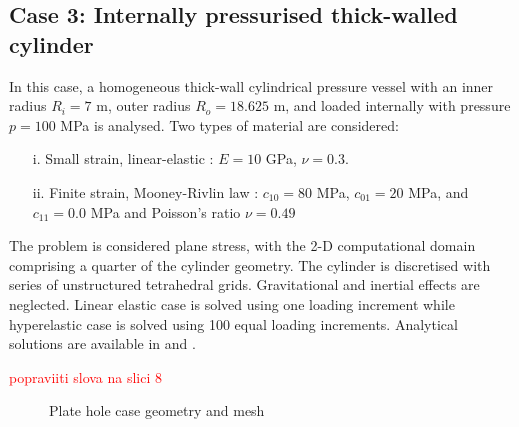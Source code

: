 \documentclass[sn-mathphys,Numbered]{sn-jnl}%
\begin{document}
\subsection{Case 3: Internally pressurised thick-walled cylinder}

In this case, a homogeneous thick-wall cylindrical pressure vessel with an inner radius $R_i = 7$ m, outer radius $R_o = 18.625$ m, and loaded internally with pressure $p = 100$ MPa is analysed. Two types of material are considered:
\begin{itemize}
\item[i.] Small strain, linear-elastic \cite{Bijelonja2006}: $E=10$ GPa, $\nu=0.3$.
\item[ii.] Finite strain, Mooney-Rivlin law \cite{Bijelonja2005a}: $c_{10} = 80$ MPa, $c_{01} = 20$ MPa, and $c_{11} = 0.0$ MPa and Poisson's ratio $\nu=0.49$
\end{itemize} 
The problem is considered plane stress, with the 2-D computational domain comprising a quarter of the cylinder geometry. The cylinder is discretised with series of unstructured tetrahedral grids. Gravitational and inertial effects are neglected. Linear elastic case is solved using one loading increment while hyperelastic case is solved using 100 equal loading increments. Analytical solutions are available in \cite{Timoshenko1970} and \cite{Green1992}.


\textcolor{red}{popraviiti slova na slici 8}


\begin{figure}[H]
 	\centering
 	\caption{Plate hole case geometry and mesh}
 	\label{fig:plateHole}
\end{figure}
\end{document}
